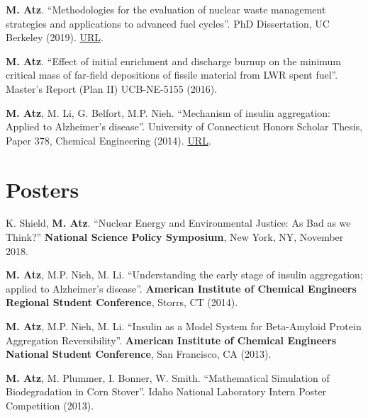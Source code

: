 \documentclass[margin,line]{resume}
\begin{document}
\begin{resume}
\begin{bibenum}
    \item \textbf{M. Atz}. ``Methodologies for the evaluation of nuclear waste management strategies and applications to advanced fuel cycles''. PhD Dissertation, UC Berkeley (2019). \href{http://search.proquest.com/openview/bf6b3e374367e5f1164c84d313c6e783/1?pq-origsite=gscholar&cbl=18750&diss=y}{URL}.

    \item \textbf{M. Atz}. ``Effect of initial enrichment and discharge burnup on the minimum critical mass of far-field depositions of fissile material from LWR spent fuel''. Master's Report (Plan II) UCB-NE-5155 (2016).

    \item \textbf{M. Atz}, M. Li, G. Belfort, M.P. Nieh. ``Mechanism of insulin aggregation: Applied to Alzheimer’s disease''. University of Connecticut Honors Scholar Thesis, Paper 378, Chemical Engineering (2014). \href{https://opencommons.uconn.edu/cgi/viewcontent.cgi?referer=&httpsredir=1&article=1386&context=srhonors_theses}{URL}.
    
\end{bibenum}
\section{\mysidestyle Posters}
\begin{bibenum}

    \item K. Shield, \textbf{M. Atz}. ``Nuclear Energy and Environmental Justice: As Bad as we Think?'' \textbf{National Science Policy Symposium}, New York, NY, November 2018.
    
    \item \textbf{M. Atz}, M.P. Nieh, M. Li. ``Understanding the early stage of insulin aggregation; applied to Alzheimer’s disease''. \textbf{American Institute of Chemical Engineers Regional Student Conference}, Storrs, CT (2014).

    \item \textbf{M. Atz}, M.P. Nieh, M. Li. ``Insulin as a Model System for Beta-Amyloid Protein Aggregation Reversibility''. \textbf{American Institute of Chemical Engineers National Student Conference}, San Francisco, CA (2013).

    \item \textbf{M. Atz}, M. Plummer, I. Bonner, W. Smith. ``Mathematical Simulation of Biodegradation in Corn Stover''. Idaho National Laboratory Intern Poster Competition (2013).


\end{bibenum}
\end{resume}
\end{document}
